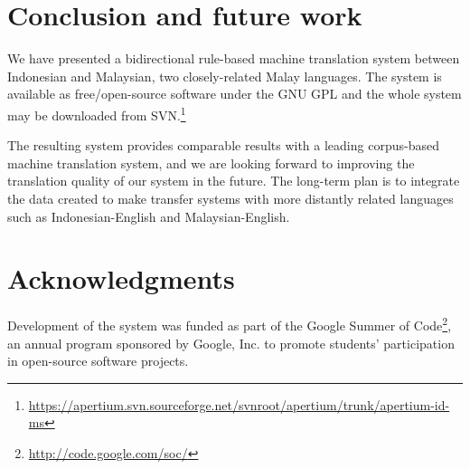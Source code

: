 \documentclass[10pt,a5paper,twoside]{article}
\begin{document}
\section*{Conclusion and future work}
We have presented a bidirectional rule-based machine translation system between Indonesian and Malaysian, two closely-related Malay languages. The system is available as free/open-source software under the GNU GPL and the whole system may be downloaded from SVN.\footnote{\url{https://apertium.svn.sourceforge.net/svnroot/apertium/trunk/apertium-id-ms}}

The resulting system provides comparable results with a leading corpus-based machine translation system, and we are looking forward to improving the translation quality of our system in the future. The long-term plan is to integrate the data created to make transfer systems with more distantly related languages such as Indonesian-English and Malaysian-English.

\section*{Acknowledgments}
Development of the system was funded as part of the Google Summer of Code\footnote{\url{http://code.google.com/soc/}}, an annual program sponsored by Google, Inc. to promote students' participation in open-source software projects.




\nocite{lewis09}
\end{document}
